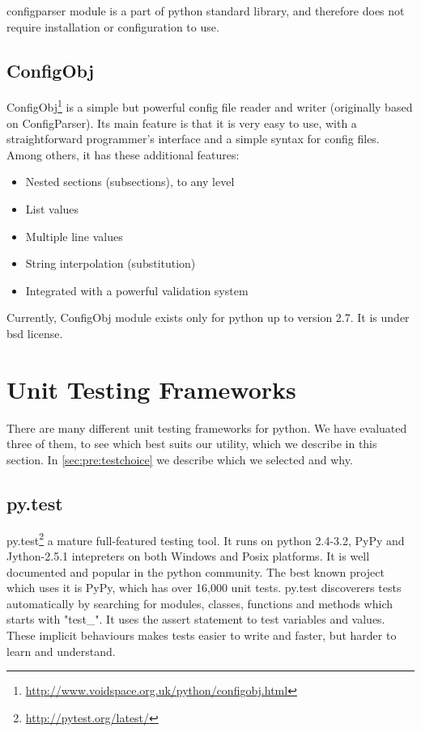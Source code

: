 configparser module is a part of \Gls{python} standard \gls{library}, and therefore does
not require installation or configuration to use.

\subsection{ConfigObj}
ConfigObj\footnote{\url{http://www.voidspace.org.uk/python/configobj.html}} is
a simple but powerful config file reader and writer (originally based on
ConfigParser). Its main feature is that it is very easy to use, with a
straightforward programmer's interface and a simple syntax for config files.
Among others, it has these additional features:
\begin{itemize}
	\item Nested sections (subsections), to any level
	\item List values
	\item Multiple line values
	\item String interpolation (substitution)
	\item Integrated with a powerful validation system
\end{itemize}

\noindent Currently, ConfigObj module exists only for \Gls{python} up to version
2.7. It is under \Gls{bsd} license.


\section{Unit Testing Frameworks}
\label{sec:pre:testing}
There are many different unit testing frameworks for \Gls{python}. We have evaluated
three of them, to see which best suits our \gls{utility}, which we describe in this
section. In \autoref{sec:pre:testchoice} we describe which we selected and why.

\subsection{py.test}
py.test\footnote{\url{http://pytest.org/latest/}} a mature full-featured testing
tool. It runs on \Gls{python} 2.4-3.2, PyPy and Jython-2.5.1 intepreters on both
Windows and Posix platforms. It is well documented and popular in the \Gls{python}
community. The best known project which uses it is PyPy, which has over 16,000
unit tests. py.test discoverers tests automatically by searching for modules,
classes, functions and methods which starts with "test\_". It uses the assert
statement to test variables and values. These implicit behaviours makes tests
easier to write and faster, but harder to learn and understand.

